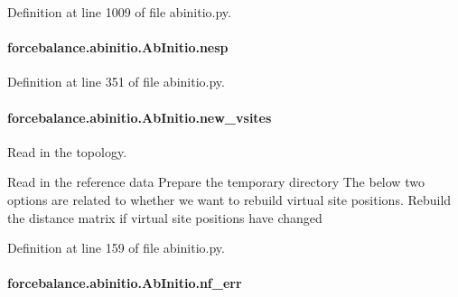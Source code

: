 Definition at line 1009 of file abinitio.\-py.

\hypertarget{classforcebalance_1_1abinitio_1_1AbInitio_ac258ad6180275ba2ffe5f68d1217e4ac}{
\paragraph[{nesp}]{\setlength{\rightskip}{0pt plus 5cm}forcebalance.\-abinitio.\-Ab\-Initio.\-nesp\hspace{0.3cm}{\ttfamily [inherited]}}}\label{classforcebalance_1_1abinitio_1_1AbInitio_ac258ad6180275ba2ffe5f68d1217e4ac}


Definition at line 351 of file abinitio.\-py.

\hypertarget{classforcebalance_1_1abinitio_1_1AbInitio_a64f1aeadac4d7b09424c20b83e5ad5af}{
\paragraph[{new\-\_\-vsites}]{\setlength{\rightskip}{0pt plus 5cm}forcebalance.\-abinitio.\-Ab\-Initio.\-new\-\_\-vsites\hspace{0.3cm}{\ttfamily [inherited]}}}\label{classforcebalance_1_1abinitio_1_1AbInitio_a64f1aeadac4d7b09424c20b83e5ad5af}


Read in the topology. 

Read in the reference data Prepare the temporary directory The below two options are related to whether we want to rebuild virtual site positions. Rebuild the distance matrix if virtual site positions have changed 

Definition at line 159 of file abinitio.\-py.

\hypertarget{classforcebalance_1_1abinitio_1_1AbInitio_a89de620e9aa500481c9e1ded99e14f72}{
\paragraph[{nf\-\_\-err}]{\setlength{\rightskip}{0pt plus 5cm}forcebalance.\-abinitio.\-Ab\-Initio.\-nf\-\_\-err\hspace{0.3cm}{\ttfamily [inherited]}}}\label{classforcebalance_1_1abinitio_1_1AbInitio_a89de620e9aa500481c9e1ded99e14f72}


